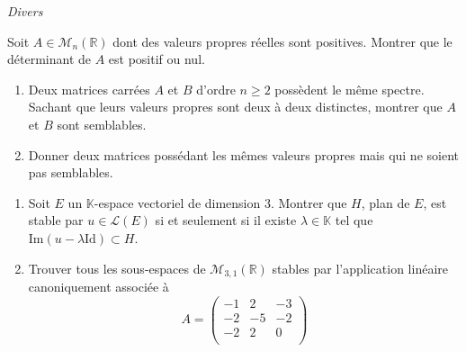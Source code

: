 \documentclass[a4paper,10pt]{report}
\begin{document}
\medskip

\begin{center}
\textit{{ {\large Divers}}}
\end{center}

\medskip

\begin{Exercice}{} Soit $A \in \mathcal{M}_{n}(\mathbb{R})$ dont des valeurs propres réelles sont positives. Montrer que le déterminant de $A$ est positif ou nul.
\end{Exercice} 




\begin{Exercice}{}
\begin{enumerate}
\item Deux matrices carrées $A$ et $B$ d'ordre $n \geq 2$ possèdent le même spectre. Sachant que leurs valeurs propres sont deux à deux distinctes, montrer que $A$ et $B$ sont semblables.
\item Donner deux matrices possédant les mêmes valeurs propres mais qui ne soient pas semblables.
\end{enumerate}
\end{Exercice} 





\begin{Exercice}{} \begin{enumerate}
\item Soit $E$ un $\mathbb{K}$-espace vectoriel de dimension $3$. Montrer que $H$, plan de $E$, est stable par $u \in \mathcal{L}(E)$ si et seulement si il existe $\lambda \in \mathbb{K}$ tel que $\textrm{Im}(u- \lambda \textrm{Id}) \subset H$.
\item Trouver tous les sous-espaces de $\mathcal{M}_{3,1}(\mathbb{R})$ stables par l'application linéaire canoniquement associée à 
$$A= \begin{pmatrix}
-1 & 2 & -3 \\
-2 & -5 & -2 \\
-2 & 2 & 0 \\
\end{pmatrix} $$
\end{enumerate}
\end{Exercice}
\end{document}
